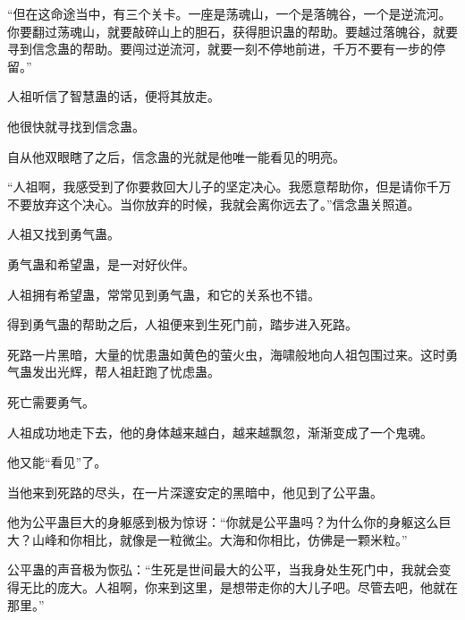 \begin{this_body}
“但在这命途当中，有三个关卡。一座是荡魂山，一个是落魄谷，一个是逆流河。你要翻过荡魂山，就要敲碎山上的胆石，获得胆识蛊的帮助。要越过落魄谷，就要寻到信念蛊的帮助。要闯过逆流河，就要一刻不停地前进，千万不要有一步的停留。”

人祖听信了智慧蛊的话，便将其放走。

他很快就寻找到信念蛊。

自从他双眼瞎了之后，信念蛊的光就是他唯一能看见的明亮。

“人祖啊，我感受到了你要救回大儿子的坚定决心。我愿意帮助你，但是请你千万不要放弃这个决心。当你放弃的时候，我就会离你远去了。”信念蛊关照道。

人祖又找到勇气蛊。

勇气蛊和希望蛊，是一对好伙伴。

人祖拥有希望蛊，常常见到勇气蛊，和它的关系也不错。

得到勇气蛊的帮助之后，人祖便来到生死门前，踏步进入死路。

死路一片黑暗，大量的忧患蛊如黄色的萤火虫，海啸般地向人祖包围过来。这时勇气蛊发出光辉，帮人祖赶跑了忧虑蛊。

死亡需要勇气。

人祖成功地走下去，他的身体越来越白，越来越飘忽，渐渐变成了一个鬼魂。

他又能“看见”了。

当他来到死路的尽头，在一片深邃安定的黑暗中，他见到了公平蛊。

他为公平蛊巨大的身躯感到极为惊讶：“你就是公平蛊吗？为什么你的身躯这么巨大？山峰和你相比，就像是一粒微尘。大海和你相比，仿佛是一颗米粒。”

公平蛊的声音极为恢弘：“生死是世间最大的公平，当我身处生死门中，我就会变得无比的庞大。人祖啊，你来到这里，是想带走你的大儿子吧。尽管去吧，他就在那里。”

\end{this_body}

